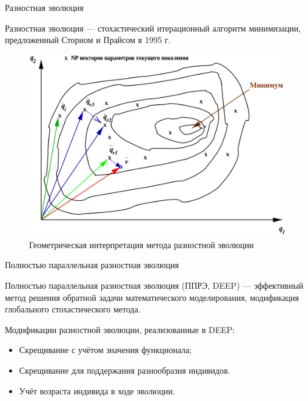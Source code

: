 \documentclass{beamer}
\begin{document}
\begin{frame}{Разностная эволюция}
    \begin{block}{Разностная эволюция}
        --- стохастический итерационный алгоритм минимизации,
        предложенный Сторном и Прайсом в 1995 г.
    \end{block}
    \begin{figure}[!h]
        \centering
        \includegraphics[scale=0.2]{DE}
        \caption{Геометрическая интерпретация метода разностной эволюции}
    \end{figure}
\end{frame}

\begin{frame}{Полностью параллельная разностная эволюция}
    \begin{block}{Полностью параллельная разностная эволюция (ППРЭ, DEEP)}
        --- эффективный метод решения
        обратной задачи математического моделирования,
        модификация глобального стохастического метода.
    \end{block}
    \bigskip

    Модификации разностной эволюции,
    реализованные в DEEP:
    \bigskip

    \begin{itemize}
        \itemsep 1em
        \item Скрещивание с учётом значения функционала;
        \item Скрещивание для поддержания разнообразия индивидов.
        \item Учёт возраста индивида в ходе эволюции.
    \end{itemize}
\end{frame}
\end{document}
